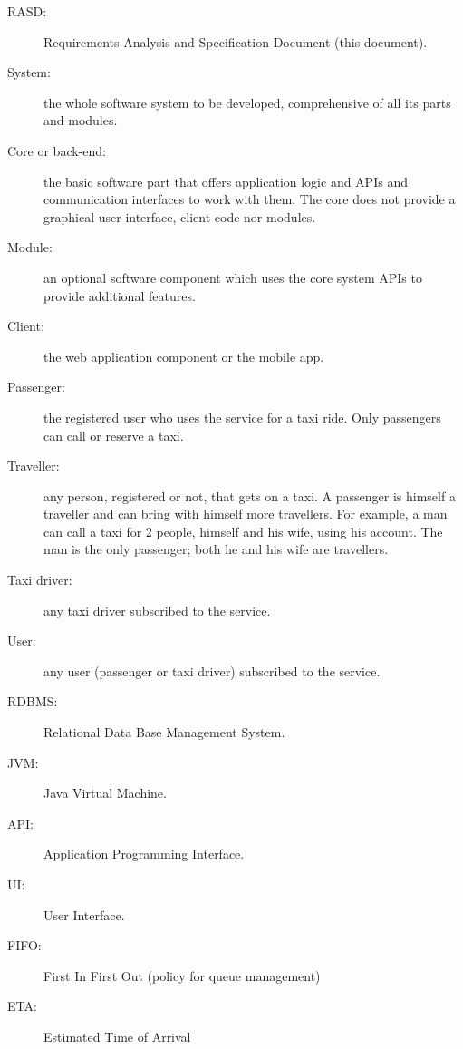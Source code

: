 \begin{description}
\item[RASD:] Requirements Analysis and Specification Document (this document).
\item[System:] the whole software system to be developed, comprehensive of all its parts and modules.
\item[Core or back-end:] the basic software part that offers application logic and APIs and communication interfaces to work with them. The core does not provide a graphical user interface, client code nor modules.
\item[Module:] an optional software component which uses the core system APIs to provide additional features.
\item[Client:] the web application component or the mobile app.
\item[Passenger:] the registered user who uses the service for a taxi ride. Only passengers can call or reserve a taxi.
\item[Traveller:] any person, registered or not, that gets on a taxi. A passenger is himself a traveller and can bring with himself more travellers.
For example, a man can call a taxi for 2 people, himself and his wife, using his account. The man is the only passenger; both he and his wife are travellers.
\item[Taxi driver:] any taxi driver subscribed to the service.
\item[User:] any user (passenger or taxi driver) subscribed to the service.
\item[RDBMS:] Relational Data Base Management System.
\item[JVM:] Java Virtual Machine.
\item[API:] Application Programming Interface.
\item[UI:] User Interface.
\item[FIFO:] First In First Out (policy for queue management)
\item[ETA:] Estimated Time of Arrival
\end{description}
